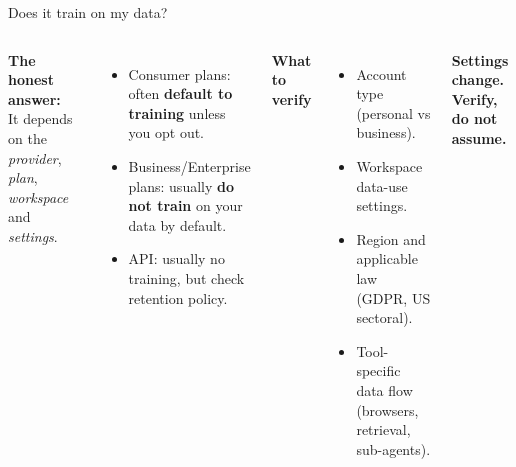 \begin{frame}{Does it train on my data?}
  \begin{columns}[T,onlytextwidth]
      \textbf{The honest answer:}\\[0.2cm]
      It depends on the \emph{provider}, \emph{plan}, \emph{workspace} and \emph{settings}.
      \vspace{0.4cm}
      \begin{itemize}\setlength\itemsep{0.3em}
        \item Consumer plans: often \textbf{default to training} unless you opt out.
        \item Business/Enterprise plans: usually \textbf{do not train} on your data by default.
        \item API: usually no training, but check retention policy.
      \end{itemize}
      \textbf{What to verify}
      \begin{itemize}\setlength\itemsep{0.3em}
        \item Account type (personal vs business).
        \item Workspace data-use settings.
        \item Region and applicable law (GDPR, US sectoral).
        \item Tool-specific data flow (browsers, retrieval, sub-agents).
      \end{itemize}
      \vspace{0.2cm}
      \begin{center}\small\color{accent}\bfseries Settings change. Verify, do not assume.\end{center}
  \end{columns}
\end{frame}

